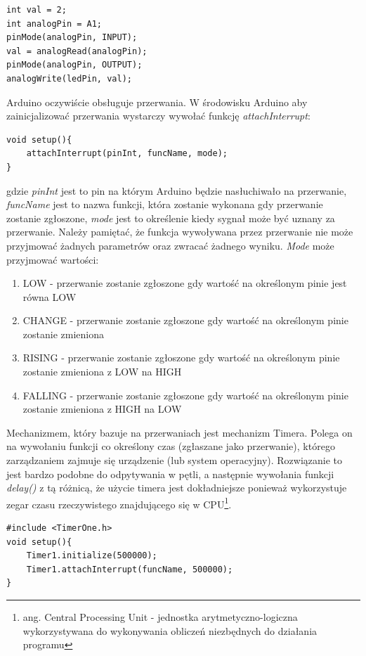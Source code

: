 \documentclass{xmgr}
\begin{document}
\begin{lstlisting}[label=bot-dirs-alg,caption=Obsługa portu analogowego w środowisku Arduino]
int val = 2;
int analogPin = A1;	
pinMode(analogPin, INPUT);
val = analogRead(analogPin);
pinMode(analogPin, OUTPUT);
analogWrite(ledPin, val);
\end{lstlisting}

Arduino oczywiście obsługuje przerwania. W środowisku Arduino aby zainicjalizować przerwania wystarczy wywołać funkcję \emph{attachInterrupt}:

\begin{lstlisting}[label=bot-dirs-alg,caption=Obsługa przerwań sprzętowych w środowisku Arduino]
void setup(){
	attachInterrupt(pinInt, funcName, mode);
}
\end{lstlisting}
gdzie \emph{pinInt} jest to pin na którym Arduino będzie nasłuchiwało na przerwanie, \emph{funcName} jest to nazwa funkcji, która zostanie wykonana gdy przerwanie zostanie zgłoszone, \emph{mode} jest to określenie kiedy sygnał może być uznany za przerwanie. Należy pamiętać, że funkcja wywoływana przez przerwanie nie może przyjmować żadnych parametrów oraz zwracać żadnego wyniku. \emph{Mode} może przyjmować wartości:
 
\begin{enumerate}
	\item LOW - przerwanie zostanie zgłoszone gdy wartość na określonym pinie jest równa LOW
	\item CHANGE - przerwanie zostanie zgłoszone gdy wartość na określonym pinie zostanie zmieniona
	\item RISING - przerwanie zostanie zgłoszone gdy wartość na określonym pinie zostanie zmieniona z LOW na HIGH
	\item FALLING - przerwanie zostanie zgłoszone gdy wartość na określonym pinie zostanie zmieniona z HIGH na LOW
\end{enumerate}

Mechanizmem, który bazuje na przerwaniach jest mechanizm Timera. Polega on na wywołaniu funkcji co określony czas (zgłaszane jako przerwanie), którego zarządzaniem zajmuje się urządzenie (lub system operacyjny). Rozwiązanie to jest bardzo podobne do odpytywania w pętli, a następnie wywołania funkcji \emph{delay()} z tą różnicą, że użycie timera jest dokładniejsze ponieważ wykorzystuje zegar czasu rzeczywistego znajdującego się w CPU\footnote{ang. Central Processing Unit - jednostka arytmetyczno-logiczna wykorzystywana do wykonywania obliczeń niezbędnych do działania programu}.
\begin{lstlisting}[label=bot-dirs-alg,caption=Przykładowe użycie timer w środowisku Arduino]
#include <TimerOne.h>
void setup(){
	Timer1.initialize(500000);
	Timer1.attachInterrupt(funcName, 500000);
}
\end{lstlisting}
\end{document}
